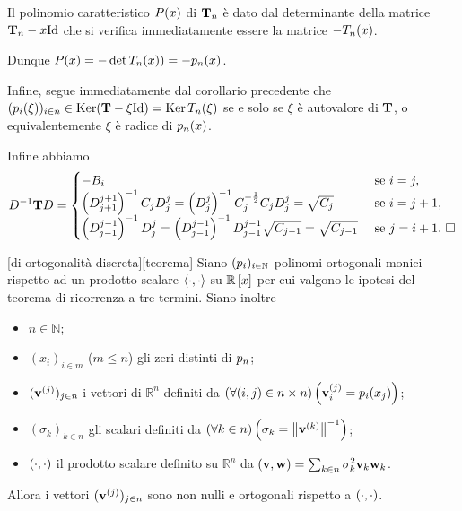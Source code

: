 \Proof Il polinomio caratteristico $P(x)$ di $\mathbf{T}_n$ \`e dato dal determinante della matrice $\VarTridiagonalMatrix_n - x \Identity$ che si verifica immediatamente essere la matrice $- T_n(x)$.
\par Dunque $P(x) = - \operatorname{det}{T_n(x))} = - p_n(x)$.
\par Infine, segue immediatamente dal corollario precedente che $(\OrthogonalPolynomial_i(\xi))_{i \in n} \in \Kernel (\VarTridiagonalMatrix - \xi \Identity ) = \Kernel{\TridiagonalMatrix_n(\xi)}$ se e solo se $\xi$ \`e autovalore di $\mathbf{T}$, o equivalentemente $\xi$ \`e radice di $p_n(x)$.
\par Infine abbiamo
\[
D^{-1}\mathbf{T}D =
\begin{cases}
	- B_i&\text{ se }i = j,\\
	\left (D_{j + 1}^{j + 1} \right)^{-1}C_jD_j^j = \left (D_j^j \right )^{-1} C_j^{-\frac{1}{2}} C_j D_j^j = \sqrt{C_j}&\text{ se }i = j + 1,\\
	\left (D_{j - 1}^{j - 1} \right )^{-1}D_j^j = \left (D_{j - 1}^{j - 1} \right )^{-1} D_{j - 1}^{j - 1} \sqrt{C_{j - 1}} = \sqrt{C_{j - 1}}&\text{ se }j = i + 1.\text{ $\square$}
\end{cases}
\]
\begin{Theorem}
	\label{IstituzioniDiAnalisiNumerica_TeoremaDiOrtogonalitaDiscreta2}
	[di ortogonalit\`a discreta][teorema] Siano $(p_i)_{i \in \mathbb{N}}$ polinomi ortogonali monici rispetto ad un prodotto scalare $\left \langle \cdot , \cdot \right \rangle$ su $\mathbb{R} \left [ x \right ]$ per cui valgono le ipotesi del teorema di ricorrenza a tre termini. Siano inoltre
	\begin{itemize}
		\item $n \in \mathbb{N}$;
		\item $(x_i)_{i \in m}$ ($m \leq n$) gli zeri distinti di $p_n$;
		\item $(\mathbf{v}^{(j)})_{j \in n}$ i vettori di $\mathbb{R}^n$ definiti da $\left ( \forall (i,j) \in n \times n \right ) \left ( \mathbf{v}^{(j)}_i = p_i(x_j) \right )$;
		\item $(\sigma_k)_{k \in n}$ gli scalari definiti da $\ForAll{k \in n}{\sigma_k = \Norm{\Vector^{(k)}}^{-1}}$;
		\item $\left ( \cdot , \cdot \right )$ il prodotto scalare definito su $\mathbb{R}^n$ da $\left ( \mathbf{v} , \mathbf{w} \right ) = \sum_{k \in n} \sigma_k^2\mathbf{v}_k\mathbf{w}_k$.
	\end{itemize}
	Allora i vettori $(\mathbf{v}^{(j)})_{j \in n}$ sono non nulli e ortogonali rispetto a $\left ( \cdot , \cdot \right )$.
\end{Theorem}
